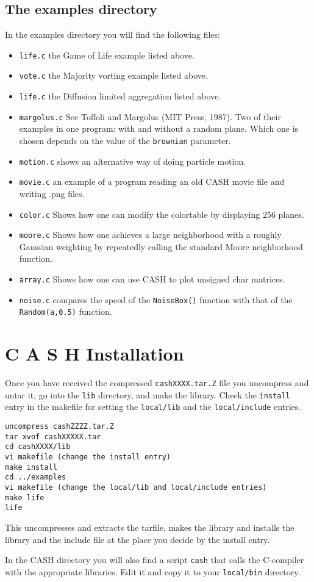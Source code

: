 \documentclass[12pt]{article}
\begin{document}
\subsection{The examples directory}
In the examples directory you will find the following files:
\begin{itemize}
\item {\tt life.c} the Game of Life example listed above.
\item {\tt vote.c} the Majority vorting example listed above.
\item {\tt life.c} the Diffusion limited aggregation listed above.
\item {\tt margolus.c} See Toffoli and Margolus (MIT Press, 1987).
Two of their examples in one program: with and without a random plane.
Which one is chosen depends on the value of the {\tt brownian}
parameter.
\item {\tt motion.c} shows an alternative way of doing particle
motion.
\item {\tt movie.c} an example of a program reading an old CASH
movie file and writing .png files.
\item {\tt color.c}
Shows how one can modify the colortable by displaying 256 planes.
\item {\tt moore.c}
Shows how one achieves a large neighborhood with a roughly
Gaussian weighting by
repeatedly calling the standard Moore neighborhood function.
\item {\tt array.c}
Shows how one can use CASH to plot unsigned char
matrices.
\item {\tt noise.c} compares the speed of the {\tt NoiseBox()} function
with that of the {\tt Random(a,0.5)} function.
\end{itemize}

\section{C A S H  Installation}
Once you have received the compressed {\tt cashXXXX.tar.Z} file
you uncompress and untar it, go into the {\tt lib} directory,
and make the library. Check the {\tt install} entry in the
makefile for setting the {\tt local/lib} and the {\tt local/include}
entries.
\begin{verbatim}
uncompress cashZZZZ.tar.Z
tar xvof cashXXXXX.tar
cd cashXXXX/lib
vi makefile (change the install entry)
make install
cd ../examples
vi makefile (change the local/lib and local/include entries)
make life
life
\end{verbatim}
This uncompresses and extracts the tarfile, makes the 
library and installs the library and the include file
at the place you decide by the install entry.

In the CASH directory you will also find a script
{\tt cash} that calls the C-compiler with the appropriate
libraries.  Edit it and copy it to your {\tt local/bin}
directory.

\newpage
\setlength{\parskip}{0pt}
\tableofcontents
\end{document}
